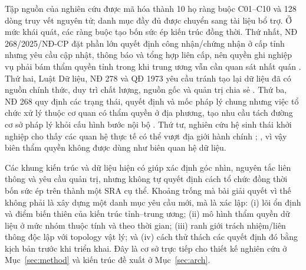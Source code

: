Tập nguồn của nghiên cứu được mã hóa thành 10 họ ràng buộc C01--C10 và 128 dòng truy vết nguyên tử; danh mục đầy đủ được chuyển sang tài liệu bổ trợ. Ở mức khái quát, các ràng buộc tạo bốn sức ép kiến trúc đồng thời. Thứ nhất, NĐ 268/2025/NĐ-CP đặt phần lớn quyết định công nhận/chứng nhận ở cấp tỉnh nhưng yêu cầu cập nhật, thông báo và tổng hợp liên cấp, nên quyền ghi nghiệp vụ phải bám thẩm quyền tỉnh trong khi trung ương vẫn cần quan sát nhất quán \citep{nd268_2025}. Thứ hai, Luật Dữ liệu, NĐ 278 và QĐ 1973 yêu cầu tránh tạo lại dữ liệu đã có nguồn chính thức, duy trì chất lượng, nguồn gốc và quản trị chia sẻ \citep{luatdulieu2024,nd278_2025,qd1973_2026}. Thứ ba, NĐ 268 quy định các trạng thái, quyết định và mốc pháp lý chung nhưng việc tổ chức xử lý thuộc cơ quan có thẩm quyền ở địa phương, tạo nhu cầu tách đường cơ sở pháp lý khỏi cấu hình bước nội bộ \citep{nd268_2025}. Thứ tư, nghiên cứu hệ sinh thái khởi nghiệp cho thấy các quan hệ thực tế có thể vượt địa giới hành chính \citep[pp.~27--28]{fischer2022}; \citep[pp.~1483--1484]{noak2025}, vì vậy biên thẩm quyền không được dùng như biên quan hệ dữ liệu.

Các khung kiến trúc và dữ liệu hiện có giúp xác định góc nhìn, nguyên tắc liên thông và yêu cầu quản trị, nhưng không tự quyết định cách tổ chức đồng thời bốn sức ép trên thành một SRA cụ thể. Khoảng trống mà bài giải quyết vì thế không phải là xây dựng một danh mục yêu cầu mới, mà là xác lập: (i) lõi ổn định và điểm biến thiên của kiến trúc tỉnh--trung ương; (ii) mô hình thẩm quyền dữ liệu ở mức nhóm thuộc tính và theo thời gian; (iii) ranh giới trách nhiệm/liên thông độc lập với topology vật lý; và (iv) cách thử thách các quyết định đó bằng kịch bản trước khi triển khai. Đây là cơ sở trực tiếp cho thiết kế nghiên cứu ở Mục~\ref{sec:method} và kiến trúc đề xuất ở Mục~\ref{sec:arch}.
